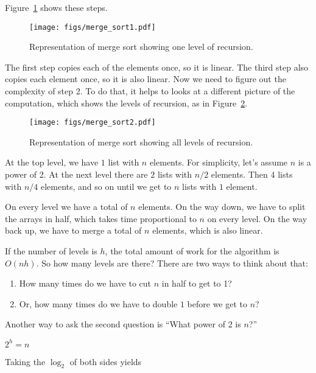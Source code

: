 \documentclass[12pt]{book}
\theoremstyle{exercise}
\begin{document}
Figure~\ref{fig-sort1}
shows these steps.

\begin{figure}
\centering
\texttt{[image: figs/merge\_sort1.pdf]}
\caption{Representation of merge sort showing one level of recursion.}
\label{fig-sort1}
\end{figure}


The first step copies each of the elements once, so it is linear. The
third step also copies each element once, so it is also linear. Now we
need to figure out the complexity of step 2. To do that, it helps to
looks at a different picture of the computation, which shows the levels
of recursion, as in Figure~\ref{fig-sort2}.

\begin{figure}
\centering
\texttt{[image: figs/merge\_sort2.pdf]}
\caption{Representation of merge sort showing all levels of recursion.}
\label{fig-sort2}
\end{figure}

At the top level, we have $1$ list with $n$ elements. 
For simplicity, let's assume $n$ is a power of 2.
At the next level there are $2$ lists with $n/2$ elements.
Then $4$ lists with $n/4$ elements, and so on until we get
to $n$ lists with $1$ element.

On every level we have a total of $n$ elements. On the way down,
we have to split the arrays in half, which takes time proportional to
$n$ on every level. On the way back up, we have to merge a total
of $n$ elements, which is also linear.

If the number of levels is $h$, the total amount of work for the
algorithm is $O(nh)$. So how many levels are there? There are two
ways to think about that:

\begin{enumerate}

\item
  How many times do we have to cut $n$ in half to get to 1?

\item
   Or, how many times do we have to double $1$ before we get to $n$?

\end{enumerate}

Another way to ask the second question is ``What power of 2 is
$n$?''

$2^h = n$

Taking the $\log_2$ of both sides yields
\end{document}
